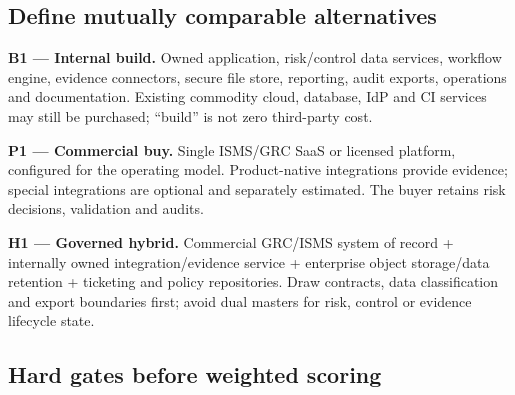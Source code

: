 \documentclass[10pt,letterpaper]{article}
\begin{document}
\subsection{Define mutually comparable alternatives}
\textbf{B1 --- Internal build.} Owned application, risk/control data services, workflow engine, evidence connectors, secure file store, reporting, audit exports, operations and documentation. Existing commodity cloud, database, IdP and CI services may still be purchased; ``build'' is not zero third-party cost.

\textbf{P1 --- Commercial buy.} Single ISMS/GRC SaaS or licensed platform, configured for the operating model. Product-native integrations provide evidence; special integrations are optional and separately estimated. The buyer retains risk decisions, validation and audits.

\textbf{H1 --- Governed hybrid.} Commercial GRC/ISMS system of record + internally owned integration/evidence service + enterprise object storage/data retention + ticketing and policy repositories. Draw contracts, data classification and export boundaries first; avoid dual masters for risk, control or evidence lifecycle state.

\subsection{Hard gates before weighted scoring}
\small
\end{document}
